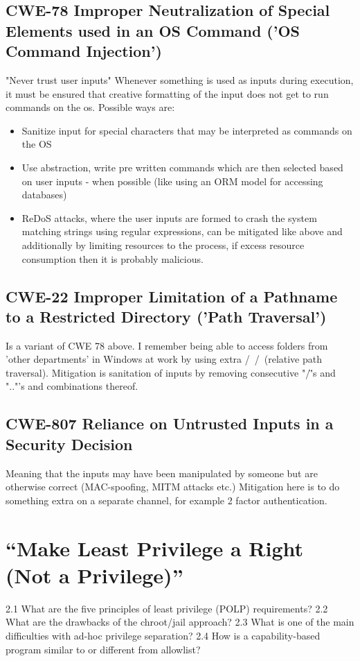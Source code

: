 \documentclass[
	letterpaper, %
	10pt, %
	unnumberedsections, %
	twoside, %
]{LTJournalArticle}
\begin{document}
\subsection{CWE-78 Improper Neutralization of Special Elements used in an OS Command ('OS Command Injection')}
"Never trust user inputs" Whenever something is used as inputs during execution, it must be ensured that creative formatting of the input does not get to run commands on the os. Possible ways are:
\begin{itemize}
	\item Sanitize input for special characters that may be interpreted as commands on the OS
	\item Use abstraction, write pre written commands which are then selected based on user inputs - when possible (like using an ORM model for accessing databases) 
	\item ReDoS attacks, where the user inputs are formed to crash the system matching strings using regular expressions, can be mitigated like above and additionally by limiting resources to the process, if excess resource consumption then it is probably malicious.   
\end{itemize} 

\subsection{CWE-22 Improper Limitation of a Pathname to a Restricted Directory ('Path Traversal')}
Is a variant of CWE 78 above. I remember being able to access folders from 'other departments' in Windows at work by using extra /\ /\ (relative path traversal). Mitigation is sanitation of inputs by removing consecutive "/\"'s and ".."'s and combinations thereof.  

\subsection{CWE-807 Reliance on Untrusted Inputs in a Security Decision}
Meaning that the inputs may have been manipulated by someone but are otherwise correct (MAC-spoofing, MITM attacks etc.)
Mitigation here is to do something extra on a separate channel, for example 2 factor authentication.


\section{“Make Least Privilege a Right (Not a Privilege)”} 

2.1 What are the five principles of least privilege (POLP) requirements?
2.2 What are the drawbacks of the chroot/jail approach?
2.3 What is one of the main difficulties with ad-hoc privilege separation?
2.4 How is a capability-based program similar to or different from allowlist?
\end{document}
